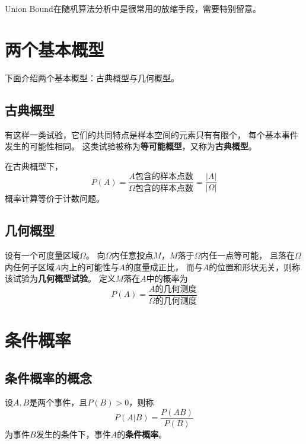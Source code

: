 \begin{remark}
  Union Bound在随机算法分析中是很常用的放缩手段，需要特别留意。
\end{remark}

\section{两个基本概型}
下面介绍两个基本概型：古典概型与几何概型。

\subsection{古典概型}
有这样一类试验，它们的共同特点是样本空间的元素只有有限个，
每个基本事件发生的可能性相同。
这类试验被称为\textbf{等可能概型}，又称为\textbf{古典概型}。

在古典概型下，
\begin{displaymath}
  P(A)=\frac{\text{$A$包含的样本点数}}{\text{$\Omega$包含的样本点数}}
  =\frac{|A|}{|\Omega|}
\end{displaymath}
概率计算等价于计数问题。

\subsection{几何概型}
设有一个可度量区域$\Omega$。
向$\Omega$内任意投点$M$，$M$落于$\Omega$内任一点等可能，
且落在$\Omega$内任何子区域$A$内上的可能性与$A$的度量成正比，
而与$A$的位置和形状无关，则称该试验为\textbf{几何概型试验}。
定义$M$落在$A$中的概率为
\begin{displaymath}
  P(A) = \frac{\text{$A$的几何测度}}{\text{$\Omega$的几何测度}}
\end{displaymath}

\section{条件概率}

\subsection{条件概率的概念}
\begin{definition}[条件概率]
  设$A,B$是两个事件，且$P(B)>0$，则称
  \begin{displaymath}
    P(A|B) = \frac{P(AB)}{P(B)}
  \end{displaymath} 
  为事件$B$发生的条件下，事件$A$的\textbf{条件概率}。
\end{definition}

